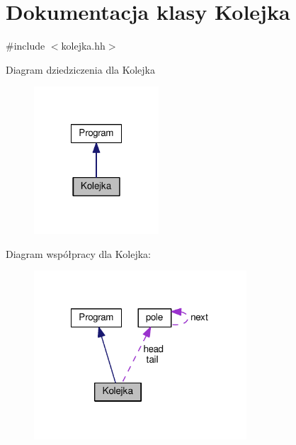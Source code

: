 \hypertarget{class_kolejka}{\section{Dokumentacja klasy Kolejka}
\label{class_kolejka}
}


{\ttfamily \#include $<$kolejka.\-hh$>$}



Diagram dziedziczenia dla Kolejka\nopagebreak
\begin{figure}[H]
\begin{center}
\leavevmode
\includegraphics[width=132pt]{class_kolejka__inherit__graph}
\end{center}
\end{figure}


Diagram współpracy dla Kolejka\-:\nopagebreak
\begin{figure}[H]
\begin{center}
\leavevmode
\includegraphics[width=225pt]{class_kolejka__coll__graph}
\end{center}
\end{figure}
